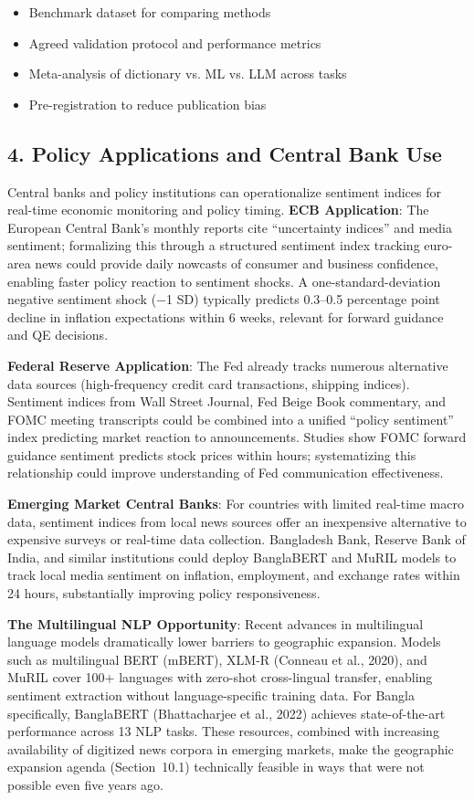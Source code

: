 \documentclass[11pt]{article}
\begin{document}
\begin{itemize}
\item Benchmark dataset for comparing methods
\item Agreed validation protocol and performance metrics
\item Meta-analysis of dictionary vs. ML vs. LLM across tasks
\item Pre-registration to reduce publication bias
\end{itemize}

\subsection{4. Policy Applications and Central Bank Use}

Central banks and policy institutions can operationalize sentiment indices for real-time economic monitoring and policy timing. \textbf{ECB Application}: The European Central Bank's monthly reports cite ``uncertainty indices'' and media sentiment; formalizing this through a structured sentiment index tracking euro-area news could provide daily nowcasts of consumer and business confidence, enabling faster policy reaction to sentiment shocks. A one-standard-deviation negative sentiment shock ($-$1 SD) typically predicts 0.3--0.5 percentage point decline in inflation expectations within 6 weeks, relevant for forward guidance and QE decisions.

\textbf{Federal Reserve Application}: The Fed already tracks numerous alternative data sources (high-frequency credit card transactions, shipping indices). Sentiment indices from Wall Street Journal, Fed Beige Book commentary, and FOMC meeting transcripts could be combined into a unified ``policy sentiment'' index predicting market reaction to announcements. Studies show FOMC forward guidance sentiment predicts stock prices within hours; systematizing this relationship could improve understanding of Fed communication effectiveness.

\textbf{Emerging Market Central Banks}: For countries with limited real-time macro data, sentiment indices from local news sources offer an inexpensive alternative to expensive surveys or real-time data collection. Bangladesh Bank, Reserve Bank of India, and similar institutions could deploy BanglaBERT and MuRIL models to track local media sentiment on inflation, employment, and exchange rates within 24 hours, substantially improving policy responsiveness.

\textbf{The Multilingual NLP Opportunity}: Recent advances in multilingual language models dramatically lower barriers to geographic expansion. Models such as multilingual BERT (mBERT), XLM-R (Conneau et al., 2020), and MuRIL cover 100+ languages with zero-shot cross-lingual transfer, enabling sentiment extraction without language-specific training data. For Bangla specifically, BanglaBERT (Bhattacharjee et al., 2022) achieves state-of-the-art performance across 13 NLP tasks. These resources, combined with increasing availability of digitized news corpora in emerging markets, make the geographic expansion agenda (Section~10.1) technically feasible in ways that were not possible even five years ago.
\end{document}

